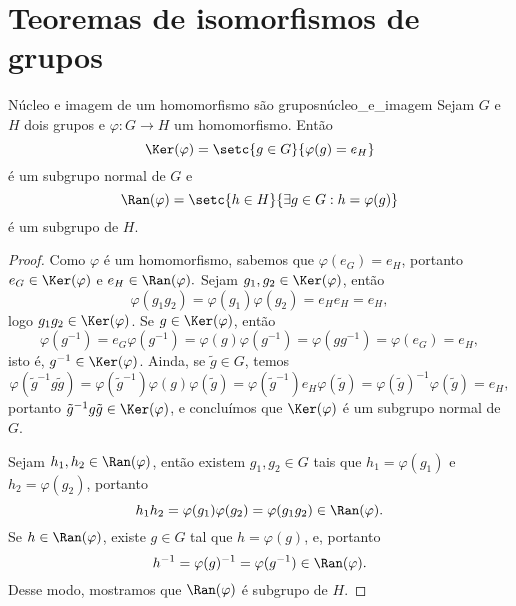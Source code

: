 \section{Teoremas de isomorfismos de grupos}
\begin{proposition}{Núcleo e imagem de um homomorfismo são grupos}{núcleo_e_imagem}
    Sejam \(G\) e \(H\) dois grupos e \(\varphi : G \to H\) um homomorfismo. Então
    \begin{equation*}
        \Ker(\varphi) = \setc{g \in G}{\varphi(g) = e_H}
    \end{equation*}
    é um subgrupo normal de \(G\) e
    \begin{equation*}
        \Ran(\varphi) = \setc{h \in H}{\exists g \in G : h = \varphi(g)}
    \end{equation*}
    é um subgrupo de \(H\).
\end{proposition}
\begin{proof}
    Como \(\varphi\) é um homomorfismo, sabemos que \(\varphi(e_G) = e_H\), portanto \(e_G \in \Ker(\varphi)\) e \(e_H \in \Ran(\varphi).\) Sejam \(g_1, g_2 \in \Ker(\varphi)\), então
    \begin{equation*}
        \varphi(g_1g_2) = \varphi(g_1)\varphi(g_2) = e_H e_H = e_H,
    \end{equation*}
    logo \(g_1g_2 \in \Ker(\varphi)\). Se \(g \in \Ker(\varphi)\), então
    \begin{equation*}
        \varphi(g^{-1}) = e_G \varphi(g^{-1}) = \varphi(g) \varphi(g^{-1}) = \varphi(g g^{-1}) = \varphi(e_G) = e_H,
    \end{equation*}
    isto é, \(g^{-1} \in \Ker(\varphi)\). Ainda, se \(\tilde{g} \in G\), temos
    \begin{equation*}
        \varphi(\tilde{g}^{-1} g \tilde{g}) = \varphi(\tilde{g}^{-1}) \varphi(g) \varphi(\tilde{g}) = \varphi(\tilde{g}^{-1}) e_H \varphi(\tilde{g}) = \varphi(\tilde{g})^{-1} \varphi(\tilde{g}) = e_H,
    \end{equation*}
    portanto \(\tilde{g}^{-1} g \tilde{g} \in \Ker(\varphi)\), e concluímos que \(\Ker(\varphi)\) é um subgrupo normal de \(G\).

    Sejam \(h_1, h_2 \in \Ran(\varphi)\), então existem \(g_1, g_2 \in G\) tais que \(h_1 = \varphi(g_1)\) e \(h_2 = \varphi(g_2)\), portanto
    \begin{equation*}
        h_1 h_2 = \varphi(g_1)\varphi(g_2) = \varphi(g_1g_2) \in \Ran(\varphi).
    \end{equation*}
    Se \(h \in \Ran(\varphi)\), existe \(g \in G\) tal que \(h = \varphi(g)\), e, portanto
    \begin{equation*}
        h^{-1} = \varphi(g)^{-1} = \varphi(g^{-1}) \in \Ran(\varphi).
    \end{equation*}
    Desse modo, mostramos que \(\Ran(\varphi)\) é subgrupo de \(H\).
\end{proof}
